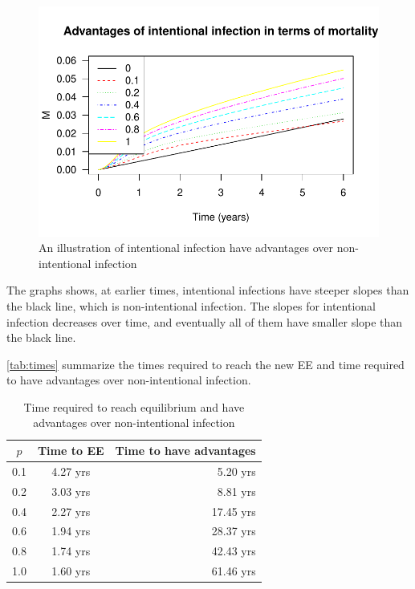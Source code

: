 \documentclass[12pt]{article}
\begin{document}
\begin{figure}[H]
  \centering
  \includegraphics[width=1.1\textwidth]{Figures/dMdt.pdf}
  \caption{An illustration of intentional infection have advantages over non-intentional infection}
\label{lessthan0.000001}
\end{figure}

The graphs shows, at earlier times, intentional infections have steeper slopes than the black line, which is non-intentional infection. The slopes for intentional infection decreases over time, and eventually all of them have smaller slope than the black line.

\autoref{tab:times} summarize the times required to reach the new EE and time required to have advantages over non-intentional infection.

\begin{table}[H]
\begin{center}
\caption{Time required to reach equilibrium and have advantages over non-intentional infection}
\label{tab:times}
\smallskip
\begin{tabular}{c|c|r}
{\bfseries $p$} & {\bfseries Time to EE} & {\bfseries Time to have advantages} \\\hline
0.1 & 4.27 yrs & 5.20 yrs \\
0.2 & 3.03 yrs & 8.81 yrs \\
0.4 & 2.27 yrs & 17.45 yrs \\
0.6 & 1.94 yrs & 28.37 yrs \\
0.8 & 1.74 yrs & 42.43 yrs \\
1.0 & 1.60 yrs & 61.46 yrs
\end{tabular}
\end{center}
\end{table}
\end{document}
